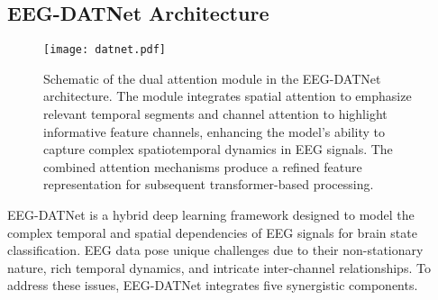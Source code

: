 \documentclass[pdflatex,sn-mathphys-num]{sn-jnl}%
\theoremstyle{thmstyleone}%
\theoremstyle{thmstyletwo}%
\theoremstyle{thmstylethree}%
\begin{document}



\subsection{EEG-DATNet Architecture}

\begin{figure}[htbp]
    \centering
    \texttt{[image: datnet.pdf]}
    \caption{Schematic of the dual attention module in the EEG-DATNet architecture. The module integrates spatial attention to emphasize relevant temporal segments and channel attention to highlight informative feature channels, enhancing the model's ability to capture complex spatiotemporal dynamics in EEG signals. The combined attention mechanisms produce a refined feature representation for subsequent transformer-based processing.}
    \label{fig:Dual Attention Module Architecture}
\end{figure}


EEG-DATNet is a hybrid deep learning framework designed to model the complex temporal and spatial dependencies of EEG signals for brain state classification. EEG data pose unique challenges due to their non-stationary nature, rich temporal dynamics, and intricate inter-channel relationships. To address these issues, EEG-DATNet integrates five synergistic components.
\end{document}
